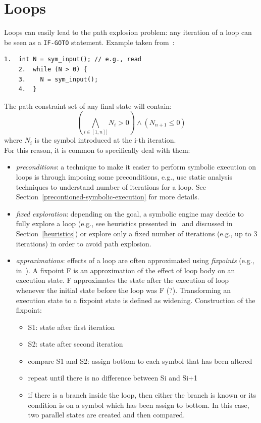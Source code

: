 \section{Loops}
\label{se:loops}

Loops can easily lead to the path explosion problem: any iteration of a loop can be seen as a {\tt IF-GOTO} statement. Example taken from~\cite{CS-CACM13}:
    \begin{lstlisting}[basicstyle=\ttfamily\small]
    1.  int N = sym_input(); // e.g., read
    2.  while (N > 0) {
    3.    N = sym_input();  
    4.  }
    \end{lstlisting}
The path constraint set of any final state will contain:
  \[ \left ( \bigwedge_{i \in [1, n]]} N_i > 0 \right ) \wedge (N_{n+1} \leq 0) \]
where $N_i$ is the symbol introduced at the i-th iteration.\\

For this reason, it is common to specifically deal with them:
\begin{itemize}

  \item {\em preconditions}: a technique to make it easier to perform symbolic execution on loops is through imposing some preconditions, e.g., use static analysis techniques to understand number of iterations for a loop. See Section~\ref{precontioned-symbolic-execution} for more details.

  \item {\em fixed exploration}: depending on the goal, a symbolic engine may decide to fully explore a loop (e.g., see heuristics presented in~\cite{AEG-NDSS11} and discussed in Section~\ref{heuristics}) or explore only a fixed number of iterations (e.g., up to 3 iterations) in order to avoid path explosion.

  \item {\em approximations}: effects of a loop are often approximated using {\em fixpoints} (e.g., in~\cite{KKM-USEC05,BNS-SP06,CFB-ACSAC06}). A fixpoint F is an approximation of the effect of loop body on an execution state. F approximates the state after the execution of loop whenever the initial state before the loop was F (?). Transforming an execution state to a fixpoint state is defined as widening. Construction of the fixpoint:
  \begin{itemize}
    \item S1: state after first iteration
    \item S2: state after second iteration
    \item compare S1 and S2: assign bottom to each symbol that has been altered
    \item repeat until there is no difference between Si and Si+1
    \item if there is a branch inside the loop, then either the branch is known or its condition is on a symbol which has been assign to bottom. In this case, two parallel states are created and then compared.
  \end{itemize}

\end{itemize}

